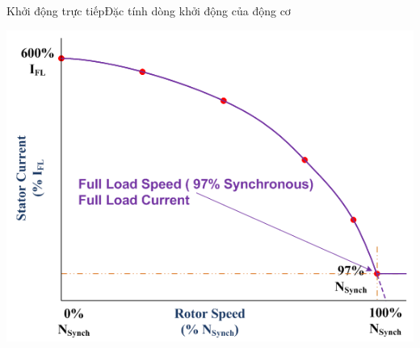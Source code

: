 \documentclass[17pt]{beamer}
\begin{document}
\begin{frame}{Khởi động trực tiếp}{Đặc tính dòng khởi động của động cơ}
\vspace{-.5cm}
\begin{center}
\includegraphics[scale=.58]{images-chude1/dongdien-tocdo.png} 
\end{center}
\end{frame}
\end{document}

